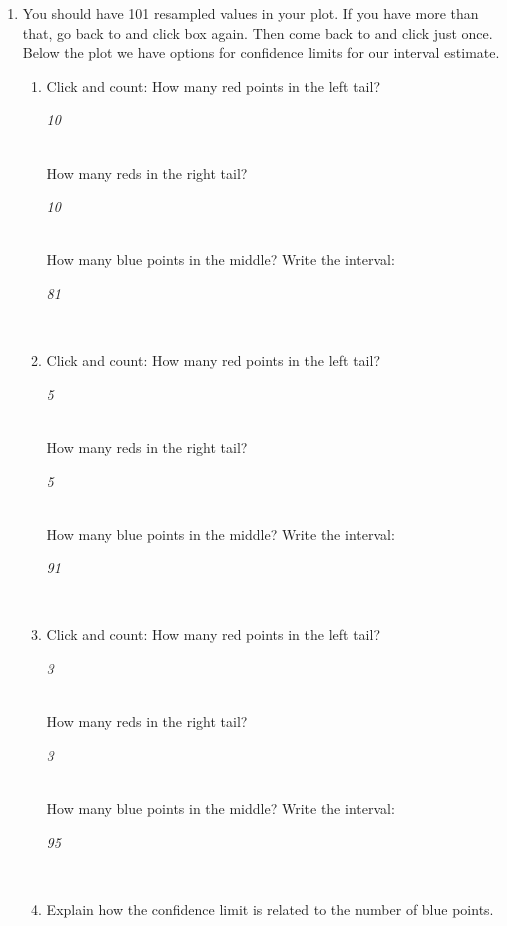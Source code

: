 \begin{enumerate}
 \item You should have 101 resampled values in your plot. If you have
   more than that, go  back to  and click
    box again. Then come back to  and
   click  just once.\\
   Below the plot we have options for confidence limits for our
   interval estimate.
   \begin{enumerate}
   \item Click  and count:  How many red points in the left tail?
\begin{key}
{\it  10}
\end{key}
     \\
     How many reds in the right tail?
\begin{key}
{\it  10}
\end{key}
     \\
     How many blue points in the middle?  \hfill Write the interval:
\begin{key}
{\it  81}
\end{key}
     \\
   \item Click  and count:  How many red points in the left tail?
\begin{key}
{\it  5}
\end{key}
     \\
     How many reds in the right tail?
\begin{key}
{\it  5}
\end{key}
     \\
     How many blue points in the middle? \hfill Write the interval:
\begin{key}
{\it  91}
\end{key}
     \\
  \item Click  and count:  How many red points in the left tail?
\begin{key}
{\it  3}
\end{key}
     \\
     How many reds in the right tail?
\begin{key}
{\it  3}
\end{key}
     \\
     How many blue points in the middle? \hfill Write the interval:
\begin{key}
{\it  95}
\end{key}
     \\
   \item Explain how the confidence limit is related to the number of
     blue points.
\begin{students}
  \vspace{1cm}
\end{students}


\end{enumerate}
\end{enumerate}
